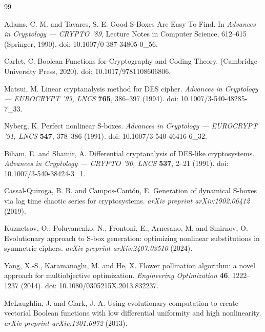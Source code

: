 \documentclass[11pt,a4paper]{article}
\begin{document}
\begin{thebibliography}{99}

Adams, C. M. and Tavares, S. E. Good S-Boxes Are Easy To Find. In \emph{Advances in Cryptology --- CRYPTO '89}, Lecture Notes in Computer Science, 612--615 (Springer, 1990). doi: 10.1007/0-387-34805-0\_56.

Carlet, C. Boolean Functions for Cryptography and Coding Theory. (Cambridge University Press, 2020). doi: 10.1017/9781108606806.

Matsui, M. Linear cryptanalysis method for DES cipher. \emph{Advances in Cryptology --- EUROCRYPT '93, LNCS} \textbf{765}, 386--397 (1994). doi: 10.1007/3-540-48285-7\_33.

Nyberg, K. Perfect nonlinear S-boxes. \emph{Advances in Cryptology --- EUROCRYPT '91, LNCS} \textbf{547}, 378--386 (1991). doi: 10.1007/3-540-46416-6\_32.

Biham, E. and Shamir, A. Differential cryptanalysis of DES-like cryptosystems. \emph{Advances in Cryptology --- CRYPTO '90, LNCS} \textbf{537}, 2--21 (1991). doi: 10.1007/3-540-38424-3\_1.

Cassal-Quiroga, B. B. and Campos-Cant\'on, E. Generation of dynamical S-boxes via lag time chaotic series for cryptosystems. \emph{arXiv preprint arXiv:1902.06412} (2019).

Kuznetsov, O., Poluyanenko, N., Frontoni, E., Arnesano, M. and Smirnov, O. Evolutionary approach to S-box generation: optimizing nonlinear substitutions in symmetric ciphers. \emph{arXiv preprint arXiv:2407.03510} (2024).

Yang, X.-S., Karamanoglu, M. and He, X. Flower pollination algorithm: a novel approach for multiobjective optimization. \emph{Engineering Optimization} \textbf{46}, 1222--1237 (2014). doi: 10.1080/0305215X.2013.832237.

McLaughlin, J. and Clark, J. A. Using evolutionary computation to create vectorial Boolean functions with low differential uniformity and high nonlinearity. \emph{arXiv preprint arXiv:1301.6972} (2013).

\end{thebibliography}
\end{document}
